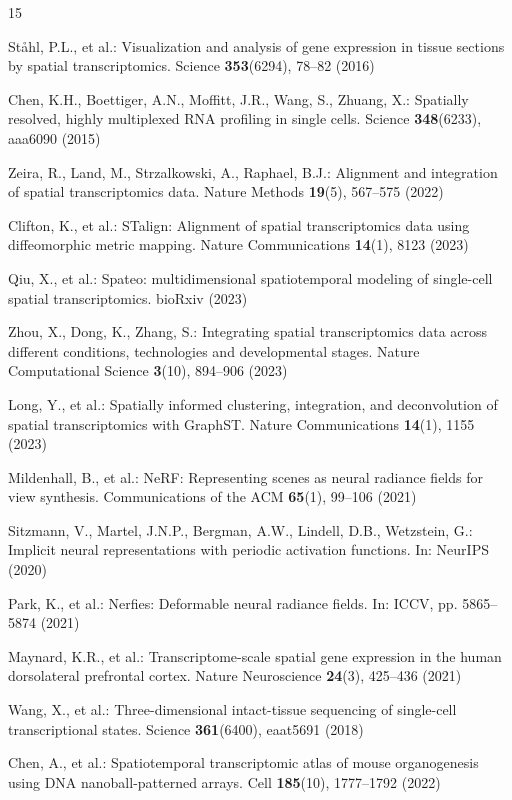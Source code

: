 \documentclass[runningheads]{llncs}
\begin{document}
%
%
\begin{thebibliography}{15}

St{\aa}hl, P.L., et al.: Visualization and analysis of gene expression in tissue sections by spatial transcriptomics. Science \textbf{353}(6294), 78--82 (2016)

Chen, K.H., Boettiger, A.N., Moffitt, J.R., Wang, S., Zhuang, X.: Spatially resolved, highly multiplexed RNA profiling in single cells. Science \textbf{348}(6233), aaa6090 (2015)

Zeira, R., Land, M., Strzalkowski, A., Raphael, B.J.: Alignment and integration of spatial transcriptomics data. Nature Methods \textbf{19}(5), 567--575 (2022)

Clifton, K., et al.: STalign: Alignment of spatial transcriptomics data using diffeomorphic metric mapping. Nature Communications \textbf{14}(1), 8123 (2023)

Qiu, X., et al.: Spateo: multidimensional spatiotemporal modeling of single-cell spatial transcriptomics. bioRxiv (2023)

Zhou, X., Dong, K., Zhang, S.: Integrating spatial transcriptomics data across different conditions, technologies and developmental stages. Nature Computational Science \textbf{3}(10), 894--906 (2023)

Long, Y., et al.: Spatially informed clustering, integration, and deconvolution of spatial transcriptomics with GraphST. Nature Communications \textbf{14}(1), 1155 (2023)

Mildenhall, B., et al.: NeRF: Representing scenes as neural radiance fields for view synthesis. Communications of the ACM \textbf{65}(1), 99--106 (2021)

Sitzmann, V., Martel, J.N.P., Bergman, A.W., Lindell, D.B., Wetzstein, G.: Implicit neural representations with periodic activation functions. In: NeurIPS (2020)

Park, K., et al.: Nerfies: Deformable neural radiance fields. In: ICCV, pp. 5865--5874 (2021)

Maynard, K.R., et al.: Transcriptome-scale spatial gene expression in the human dorsolateral prefrontal cortex. Nature Neuroscience \textbf{24}(3), 425--436 (2021)

Wang, X., et al.: Three-dimensional intact-tissue sequencing of single-cell transcriptional states. Science \textbf{361}(6400), eaat5691 (2018)

Chen, A., et al.: Spatiotemporal transcriptomic atlas of mouse organogenesis using DNA nanoball-patterned arrays. Cell \textbf{185}(10), 1777--1792 (2022)

\end{thebibliography}
\end{document}
